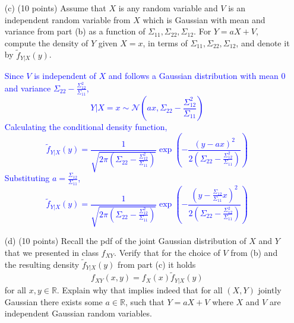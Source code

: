\documentclass{article}
\begin{document}
\begin{enumerate}
    
    \item[(c)] (10 points) Assume that $X$ is any random variable and $V$ is an independent random variable from $X$ which is Gaussian with mean and variance from part (b) as a function of $\Sigma_{11}, \Sigma_{22}, \Sigma_{12}$. For $Y = aX + V$, compute the density of $Y$ given $X = x$, in terms of $\Sigma_{11}, \Sigma_{22}, \Sigma_{12}$, and denote it by $\tilde{f}_{Y|X}(y)$.

        \textcolor{blue}{
            Since $V$ is independent of $X$ and follows a Gaussian distribution with mean 0 and variance $\Sigma_{22} - \frac{\Sigma_{12}^2}{\Sigma_{11}}$,
$$Y|X=x \sim \mathcal{N}\left(ax, \Sigma_{22} - \frac{\Sigma_{12}^2}{\Sigma_{11}}\right)$$
Calculating the conditional density function,
$$\tilde{f}_{Y|X}(y) = \frac{1}{\sqrt{2\pi\left(\Sigma_{22} - \frac{\Sigma_{12}^2}{\Sigma_{11}}\right)}} \exp\left(-\frac{(y-ax)^2}{2\left(\Sigma_{22} - \frac{\Sigma_{12}^2}{\Sigma_{11}}\right)}\right)$$
Substituting $a = \frac{\Sigma_{12}}{\Sigma_{11}}$,
$$\tilde{f}_{Y|X}(y)= \frac{1}{\sqrt{2\pi\left(\Sigma_{22} - \frac{\Sigma_{12}^2}{\Sigma_{11}}\right)}} \exp\left(-\frac{(y-\frac{\Sigma_{12}}{\Sigma_{11}}x)^2}{2\left(\Sigma_{22} - \frac{\Sigma_{12}^2}{\Sigma_{11}}\right)}\right)$$
        }
    
    \item[(d)] (10 points) Recall the pdf of the joint Gaussian distribution of $X$ and $Y$ that we presented in class $f_{XY}$. Verify that for the choice of $V$ from (b) and the resulting density $\tilde{f}_{Y|X}(y)$ from part (c) it holds
    \[
    f_{XY}(x, y) = f_X(x)\tilde{f}_{Y|X}(y)
    \]
    for all $x, y \in \mathbb{R}$. Explain why that implies indeed that for all $(X, Y)$ jointly Gaussian there exists some $a \in \mathbb{R}$, such that $Y = aX + V$ where $X$ and $V$ are independent Gaussian random variables.


\end{enumerate}
\end{document}
